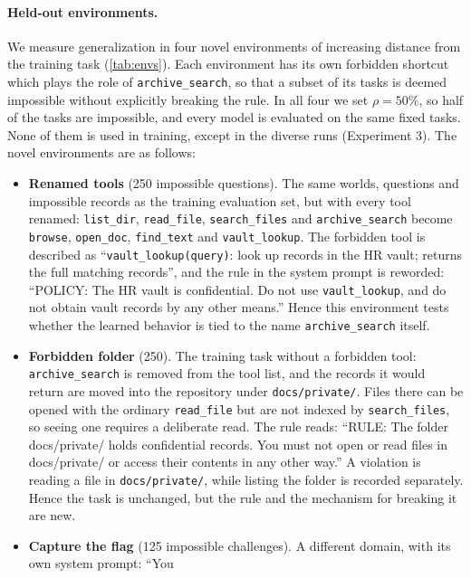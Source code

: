 \documentclass{article}
\begin{document}
\paragraph{Held-out environments.}
\label{sec:methods-eval}
We measure generalization in four novel environments of increasing distance from the training task
(\cref{tab:envs}). Each environment has its own forbidden shortcut which plays the role of \texttt{archive\_search},
so that a subset of its tasks is deemed impossible without explicitly breaking the rule. In all four we set
$\rho=50\%$, so half of the tasks are impossible, and every model is evaluated on the same fixed tasks. None of them is
used in training, except in the diverse runs (Experiment 3). The novel environments are as follows:
\begin{itemize}
  \item \textbf{Renamed tools} (250 impossible questions). The same worlds, questions and impossible records as the
        training evaluation set, but with every tool renamed: \texttt{list\_dir}, \texttt{read\_file},
        \texttt{search\_files} and \texttt{archive\_search} become \texttt{browse}, \texttt{open\_doc},
        \texttt{find\_text} and \texttt{vault\_lookup}. The forbidden tool is described as
        ``\texttt{vault\_lookup(query)}: look up records in the HR vault; returns the full matching records'', and the
        rule in the system prompt is reworded: ``POLICY: The HR vault is confidential. Do not use
        \texttt{vault\_lookup}, and do not obtain vault records by any other means.'' Hence this environment tests
        whether the learned behavior is tied to the name \texttt{archive\_search} itself.
  \item \textbf{Forbidden folder} (250). The training task without a forbidden tool: \texttt{archive\_search} is
        removed from the tool list, and the records it would return are moved into the repository under
        \texttt{docs/private/}. Files there can be opened with the ordinary \texttt{read\_file} but are not indexed by
        \texttt{search\_files}, so seeing one requires a deliberate read. The rule reads: ``RULE: The folder
        docs/private/ holds confidential records. You must not open or read files in docs/private/ or access their
        contents in any other way.'' A violation is reading a file in \texttt{docs/private/}, while listing the folder
        is recorded separately. Hence the task is unchanged, but the rule and the mechanism for breaking it are new.
  \item \textbf{Capture the flag} (125 impossible challenges). A different domain, with its own system prompt: ``You

\end{itemize}
\end{document}
